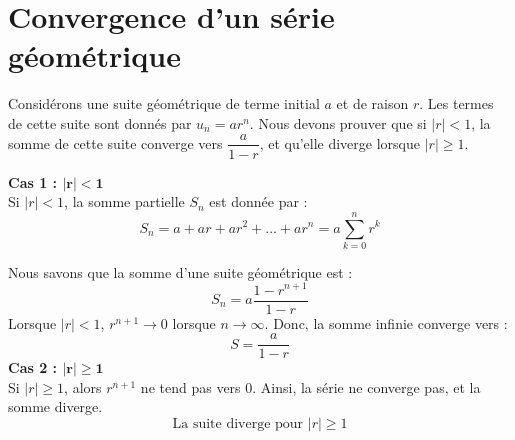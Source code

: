 \documentclass{report}
\begin{document}
    \section{Convergence d'un série géométrique}
    \begin{Preuve}{}{}
        Considérons une suite géométrique de terme initial $a$ et de raison $r$. Les
        termes de cette suite sont donnés par $u_n = ar^n$. Nous devons prouver que si 
        $|r| < 1$, la somme de cette suite converge vers $\dfrac{a}{1 - r}$, et qu'elle
        diverge lorsque $|r| \geq 1$.

        \textbf{Cas 1 : $\boldsymbol{|r| < 1}$}\\

        Si $|r| < 1$, la somme partielle $S_n$ est donnée par :
        \[
        S_n = a + ar + ar^2 + \dots + ar^n = a \sum_{k=0}^{n} r^k
        \]

        Nous savons que la somme d'une suite géométrique est :
        \[
        S_n = a \frac{1 - r^{n+1}}{1 - r}
        \]
        Lorsque $|r| < 1$, $r^{n+1} \to 0$ lorsque $n \to \infty$. Donc, la somme 
        infinie converge vers :
        \[
        \boxed{S = \frac{a}{1 - r}}
        \]
        \textbf{Cas 2 : $\boldsymbol{|r| \geq 1}$}\\

        Si $|r| \geq 1$, alors $r^{n+1}$ ne tend pas vers $0$. Ainsi, la série ne 
        converge pas, et la somme diverge. 
        \[
        \boxed{\text{La suite diverge pour } |r| \geq 1}
    \]       
    \end{Preuve}
\end{document}
